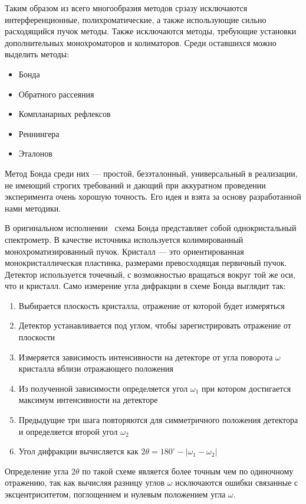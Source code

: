 \documentclass[a4paper, 12pt]{article}
\begin{document}
Таким образом из всего многообразия методов срзазу исключаются интерференционные, полихроматические, а также использующие сильно расходящийся пучок методы. Также исключаются методы, требующие установки дополнительных монохроматоров и колиматоров.
Среди оставшихся можно выделить методы:
\begin{itemize}
    \item Бонда
    \item Обратного рассеяния
    \item Компланарных рефлексов
    \item Реннингера
    \item Эталонов
\end{itemize}
Метод Бонда среди них --- простой, безэталонный, универсальный в реализации, не имеющий строгих требований и дающий при аккуратном проведении эксперимента очень хорошую точность.
Его идея и взята за основу разработанной нами методики.

В оригинальном исполнении~\cite{Bond:1960} схема Бонда представляет собой однокристальный спектрометр.
В качестве источника используется колимированный монохроматизированный пучок.
Кристалл --- это ориентированная монокристаллическая пластинка, размерами превосходящая первичный пучок.
Детектор используется точечный, с возможностью вращаться вокруг той же оси, что и кристалл.
Само измерение угла дифракции в схеме Бонда выглядит так:
\begin{enumerate}
    \item Выбирается плоскость кристалла, отражение от которой будет измеряться
    \item Детектор устанавливается под углом, чтобы зарегистрировать отражение от плоскости
    \item Измеряется зависимость интенсивности на детекторе от угла поворота $\omega$ кристалла вблизи отражающего положения
    \item Из полученной зависимости определяется угол $\omega_1$ при котором достигается максимум интенсивности на детекторе
    \item Предыдущие три шага повторяются для симметричного положения детектора и определяется второй угол $\omega_2$
    \item Угол дифракции вычисляется как $2\theta=180^\circ-|\omega_1-\omega_2|$
\end{enumerate}
Определение угла $2\theta$ по такой схеме является более точным чем по одиночному отражению, так как вычисляя разницу углов $\omega$ исключаются ошибки связанные с эксцентриситетом, поглощением и нулевым положением угла $\omega$.
\end{document}
